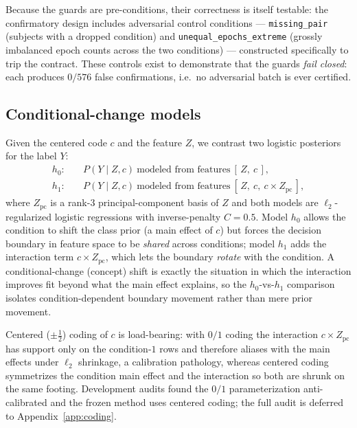 Because the guards are pre-conditions, their correctness is itself testable: the confirmatory design includes
adversarial control conditions --- \texttt{missing\_pair} (subjects with a dropped condition) and
\texttt{unequal\_epochs\_extreme} (grossly imbalanced epoch counts across the two conditions) --- constructed
specifically to trip the contract. These controls exist to demonstrate that the guards \emph{fail closed}:
each produces $0/576$ false confirmations, i.e.\ no adversarial batch is ever certified.

\subsection{Conditional-change models}
\label{sec:b3-models}
Given the centered code $c$ and the feature $Z$, we contrast two logistic posteriors for the label $Y$:
\begin{align}
  h_0:&\quad P(Y\mid Z,c)\ \text{modeled from features}\ [\,Z,\ c\,], \label{eq:h0}\\
  h_1:&\quad P(Y\mid Z,c)\ \text{modeled from features}\ [\,Z,\ c,\ c\times Z_{\mathrm{pc}}\,],
  \label{eq:h1}
\end{align}
where $Z_{\mathrm{pc}}$ is a rank-$3$ principal-component basis of $Z$ and both models are $\ell_2$-regularized
logistic regressions with inverse-penalty $C=0.5$. Model $h_0$ allows the condition to shift the class prior
(a main effect of $c$) but forces the decision boundary in feature space to be \emph{shared} across
conditions; model $h_1$ adds the interaction term $c\times Z_{\mathrm{pc}}$, which lets the boundary
\emph{rotate} with the condition. A conditional-change (concept) shift is exactly the situation in which the
interaction improves fit beyond what the main effect explains, so the $h_0$-vs-$h_1$ comparison isolates
condition-dependent boundary movement rather than mere prior movement.

Centered ($\pm\tfrac12$) coding of $c$ is load-bearing: with $0/1$ coding the interaction $c\times Z_{\mathrm{pc}}$
has support only on the condition-$1$ rows and therefore aliases with the main effects under $\ell_2$
shrinkage, a calibration pathology, whereas centered coding symmetrizes the condition main effect and the
interaction so both are shrunk on the same footing. Development audits found the $0/1$ parameterization
anti-calibrated and the frozen method uses centered coding; the full audit is deferred to
Appendix~\ref{app:coding}.

